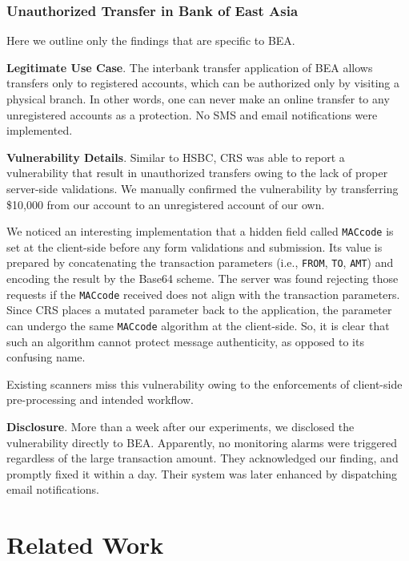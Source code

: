 \documentclass[letter]{sig-alternate-2013}
\begin{document}
\subsubsection{Unauthorized Transfer in Bank of East Asia}

Here we outline only the findings that are specific to BEA.

\textbf{Legitimate Use Case}. The interbank transfer application of BEA allows transfers only to registered accounts, which can be authorized only by visiting a physical branch. In other words, one can never make an online transfer to any unregistered accounts as a protection. No SMS and email notifications were implemented. 

\textbf{Vulnerability Details}. Similar to HSBC, CRS was able to report a vulnerability that result in unauthorized transfers owing to the lack of proper server-side validations. We manually confirmed the vulnerability by transferring \$10,000 from our account to an unregistered account of our own.

We noticed an interesting implementation that a hidden field called \verb"MACcode" is set at the client-side before any form validations and submission. Its value is prepared by concatenating the transaction parameters (i.e., \verb"FROM", \verb"TO", \verb"AMT") and encoding the result by the Base64 scheme. The server was found rejecting those requests if the \verb"MACcode" received does not align with the transaction parameters. 
Since CRS places a mutated parameter back to the application, the parameter can undergo the same \verb"MACcode" algorithm at the client-side. So, it is clear that such an algorithm cannot protect message authenticity, as opposed to its confusing name.

Existing scanners miss this vulnerability owing to the enforcements of client-side pre-processing and intended workflow.

\textbf{Disclosure}. More than a week after our experiments, we disclosed the vulnerability directly to BEA. Apparently, no monitoring alarms were triggered regardless of the large transaction amount. They acknowledged our finding, and promptly fixed it within a day. Their system was later enhanced by dispatching email notifications.




%
 \section{Related Work}
\label{sec:crs_related}
\end{document}

